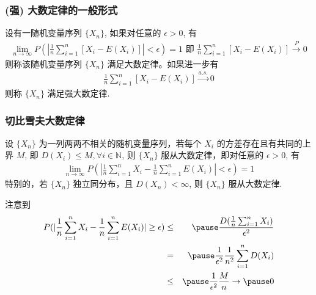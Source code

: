 \begin{frame}
	\frametitle{(强) 大数定律的一般形式}
	\begin{defi}
		设有一随机变量序列 $\{X_n\}$, 如果对任意的 $\epsilon>0$, 有
		\begin{eqnarray*}
			\lim_{n\rightarrow\infty} P (|\frac{1}{n}\sum_{i=1}^n [X_i-E (X_i)]|<\epsilon)=1 \mbox{ 即 }  \frac{1}{n}\sum_{i=1}^n [X_i-E (X_i)]\stackrel{P}{\rightarrow} 0
		\end{eqnarray*}
		则称该随机变量序列 $\{X_n\}$ 满足大数定律。如果进一步有
		\begin{eqnarray*}
			\frac{1}{n}\sum_{i=1}^n[X_i-E(X_i)]\stackrel{a.s.}{\rightarrow}0
		\end{eqnarray*}
		则称 $\{X_n\}$ 满足强大数定律.
	\end{defi}
\end{frame}
\begin{frame}
	\frametitle{切比雪夫大数定律}
	\begin{thm}
		设 $\{X_n\}$ 为一列两两不相关的随机变量序列，若每个 $X_i$ 的方差存在且有共同的上界 $M$, 即 $D (X_i)\le M, \forall i\in \mathbb{N}$, 则 $\{X_n\}$ 服从大数定律，即对任意的 $\epsilon>0$, 有
		\begin{eqnarray*}
			\lim_{n\rightarrow\infty}P(|\frac{1}{n}\sum_{i=1}^nX_i-\frac{1}{n}\sum_{i=1}^nE(X_i)|<\epsilon)=1
		\end{eqnarray*}
		特别的，若 $\{X_n\}$ 独立同分布，且 $D (X_n)<\infty$, 则 $\{X_n\}$ 服从大数定律.
	\end{thm}

	\pause \zheng 注意到
	\begin{eqnarray*}
		P(|\frac{1}{n}\sum_{i=1}^nX_i-\frac{1}{n}\sum_{i=1}^nE(X_i)|\ge\epsilon)&\le&\pause  \dfrac{D(\frac{1}{n}\sum_{i=1}^nX_i)}{\epsilon^2}\\
		&=&\pause \dfrac{1}{\epsilon^2}\dfrac{1}{n^2}\sum_{i=1}^nD(X_i)\\
		&\le&\pause \dfrac{1}{\epsilon^2}\dfrac{M}{n}\rightarrow\pause 0
	\end{eqnarray*}

\end{frame}

